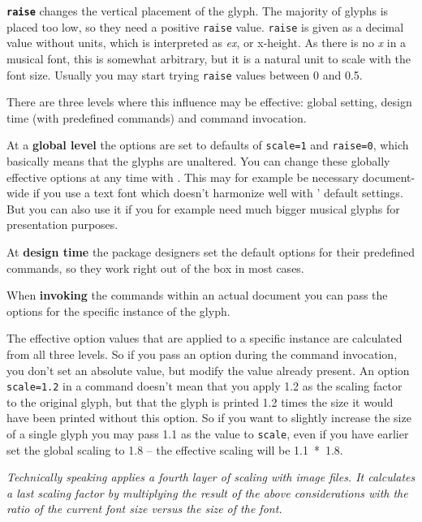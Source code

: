 \documentclass{OLLbook}
\begin{document}
\medskip
\texttt{\textbf{raise}} changes the vertical placement of the glyph.
The majority of glyphs is placed too low, so they need a positive \texttt{raise} value.
\texttt{raise} is given as a decimal value without units, which is interpreted as \emph{ex}, or x-height. 
As there is no \emph{x} in a musical font, this is somewhat arbitrary, but it is a natural unit to scale with the font size.
Usually you may start trying \texttt{raise} values between 0 and 0.5.

\medskip
There are three levels where this influence may be effective: global setting, design time (with predefined commands) and command invocation.

At a \textbf{global level} the options are set to defaults of \texttt{scale=1} and \texttt{raise=0}, which basically means that the glyphs are unaltered.
You can change these globally effective options at any time with .
This may for example be necessary document-wide if you use a text font which doesn't harmonize well with \lilyglyphs*' default settings.
But you can also use it if you for example need much bigger musical glyphs for presentation purposes.

At \textbf{design time} the package designers set the default options for their predefined commands, so they work right out of the box in most cases.

When \textbf{invoking} the commands within an actual document you can pass the options for the specific instance of the glyph.

The effective option values that are applied to a specific instance are calculated from all three levels. 
So if you pass an option during the command invocation, you don't set an absolute value, but modify the value already present. 
An option \texttt{scale=1.2} in a command doesn't mean that you apply 1.2 as the scaling factor to the original glyph, but that the glyph is printed 1.2 times the size it would have been printed without this option.
So if you want to slightly increase the size of a single glyph you may pass 1.1 as the value to \texttt{scale}, even if you have earlier set the global scaling to 1.8 -- the effective scaling will be \mbox{1.1 * 1.8.}

\textit{Technically speaking \lilyglyphs applies a fourth layer of scaling with image files.
It calculates a last scaling factor by multiplying the result of the above considerations with the ratio of the current font size versus the size of the  font.}
\end{document}
